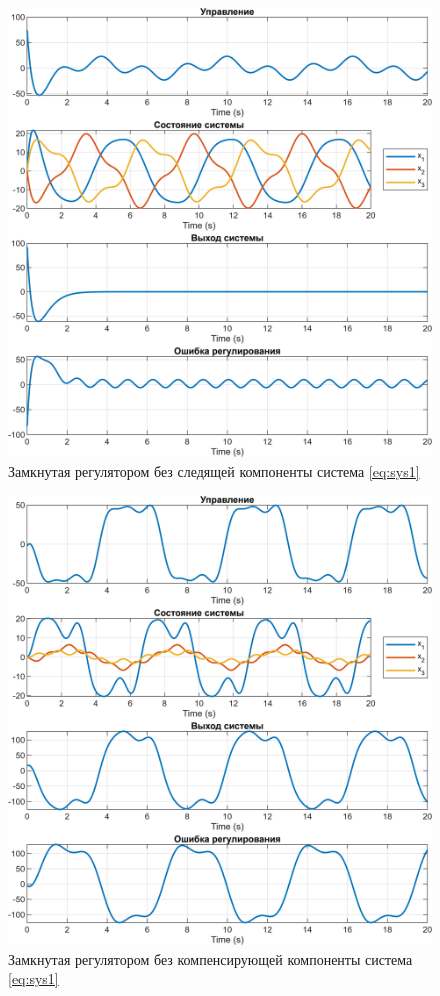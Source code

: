 \begin{figure}[H]
    \centering
    \includegraphics[width=\linewidth]{figs/12_sim.png}
    \caption{Замкнутая регулятором без следящей компоненты система \eqref{eq:sys1}}
    \label{fig:12sim}
\end{figure}
\begin{figure}[H]
    \centering
    \includegraphics[width=\linewidth]{figs/13_sim.png}
    \caption{Замкнутая регулятором без компенсирующей компоненты система \eqref{eq:sys1}}
    \label{fig:13sim}
\end{figure}
